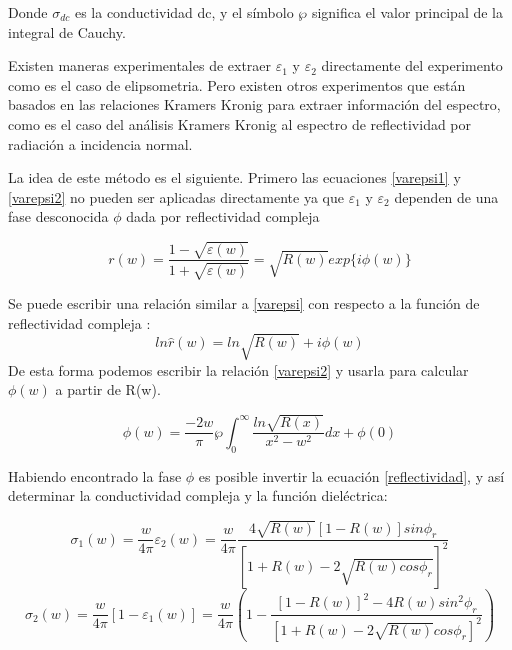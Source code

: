 \documentclass[a4paper,openright,12pt]{book}
\begin{document}
Donde $\sigma_{dc}$ es la conductividad dc, y el símbolo $\wp$ significa el valor principal de la integral de Cauchy. 

Existen maneras experimentales de extraer $\varepsilon_{1}$  y $\varepsilon_{2}$ directamente del experimento como es el caso de elipsometria. Pero existen otros experimentos que están basados en las relaciones Kramers Kronig para extraer información del espectro, como es el caso del análisis Kramers Kronig al espectro de reflectividad por radiación a incidencia normal. 

La idea de este método es el siguiente. Primero las ecuaciones \ref{varepsi1} y \ref{varepsi2} no pueden ser aplicadas directamente ya que $\varepsilon_{1}$  y $\varepsilon_{2}$  dependen de una fase desconocida $\phi$ dada por reflectividad compleja \cite{constrained}
\begin{center}

\begin{equation}\label{reflectividad}
r(w)=\frac{1-\sqrt{\varepsilon(w)}}{1+\sqrt{\varepsilon(w)}}=\sqrt{R(w)}exp\{i\phi(w)\}
\end{equation}

\end{center}
Se puede escribir una relación similar a \ref{varepsi} con respecto a la función de reflectividad compleja \cite{constrained}:
\begin{equation}
ln\hat{r}(w)=ln\sqrt{R(w)}+i\phi(w)
\end{equation}
De esta forma podemos escribir la relación \ref{varepsi2}  y usarla para calcular $\phi(w)$ a partir de R(w).

\begin{equation}\label{phi}
\phi(w)=\frac{-2w}{\pi}\wp\int_{0}^{\infty}\frac{ln\sqrt{R(x)}}{x^{2}-w^{2}}dx+\phi(0)
\end{equation}

Habiendo encontrado la fase $\phi$ es posible invertir la ecuación \ref{reflectividad}, y así determinar la conductividad compleja y la función dieléctrica: \cite{OpticalTechniques}

\begin{equation}
\sigma_{1}(w)=\frac{w}{4\pi}\varepsilon_{2}(w)=\frac{w}{4\pi}\frac{4\sqrt{R(w)}[1-R(w)]sin\phi_{r}}{[1+R(w)-2\sqrt{R(w)cos\phi_{r}}]^{2}}
\end{equation}
\begin{equation}
\sigma_{2}(w)=\frac{w}{4\pi}[1-\varepsilon_{1}(w)]=\frac{w}{4\pi}(1-\frac{[1-R(w)]^{2}-4R(w)sin^{2}\phi_{r}}{[1+R(w)-2\sqrt{R(w)}cos\phi_{r}]^{2}})
\end{equation}
\end{document}
